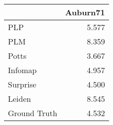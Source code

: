 \begin{tabular}{lr}
\toprule
{} & Auburn71 \\
\midrule
PLP          &    5.577 \\
PLM          &    8.359 \\
Potts        &    3.667 \\
Infomap      &    4.957 \\
Surprise     &    4.500 \\
Leiden       &    8.545 \\
Ground Truth &    4.532 \\
\bottomrule
\end{tabular}
